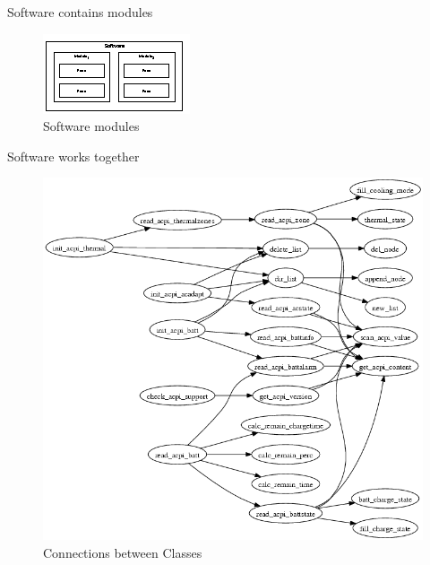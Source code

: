 \documentclass{beamer}
\begin{document}
\begin{frame}{Software contains modules}
    \begin{figure}
        \includegraphics[width=.7\paperwidth]{figure/software-modules}
        \caption{Software modules}
        \label{fig:softwareModules}
    \end{figure}
\end{frame}

\begin{frame}{Software works together}
    \begin{figure}
        \includegraphics[height=.7\paperheight]{figure/graph.png}
        \caption{Connections between Classes}
        \label{fig:classConnection}
    \end{figure}
\end{frame}

\end{document}
